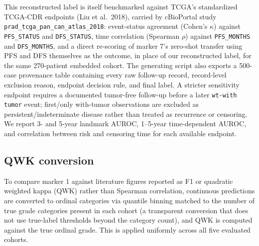 This reconstructed label is itself benchmarked against TCGA's standardized TCGA-CDR endpoints
(Liu et al.\ 2018), carried by cBioPortal study \texttt{prad\_tcga\_pan\_can\_atlas\_2018}:
event-status agreement (Cohen's $\kappa$) against \texttt{PFS\_STATUS} and \texttt{DFS\_STATUS},
time correlation (Spearman $\rho$) against \texttt{PFS\_MONTHS} and \texttt{DFS\_MONTHS}, and a
direct re-scoring of marker 7's zero-shot transfer using PFS and DFS themselves as the outcome,
in place of our reconstructed label, for the same 270-patient embedded cohort.
The generating script also exports a 500-case provenance table containing every raw follow-up
record, record-level exclusion reason, endpoint decision rule, and final label. A stricter
sensitivity endpoint requires a documented tumor-free follow-up before a later
\texttt{wt-with tumor} event; first/only with-tumor observations are excluded as
persistent/indeterminate disease rather than treated as recurrence or censoring. We report
3- and 5-year landmark AUROC, 1--5-year time-dependent AUROC, and correlation between risk and
censoring time for each available endpoint.

\subsection{QWK conversion}

To compare marker 1 against literature figures reported as F1 or quadratic weighted kappa
(QWK) rather than Spearman correlation, continuous predictions are converted to ordinal
categories via quantile binning matched to the number of true grade categories present in each
cohort (a transparent conversion that does not use true-label thresholds beyond the category
count), and QWK is computed against the true ordinal grade. This is applied uniformly across
all five evaluated cohorts.
